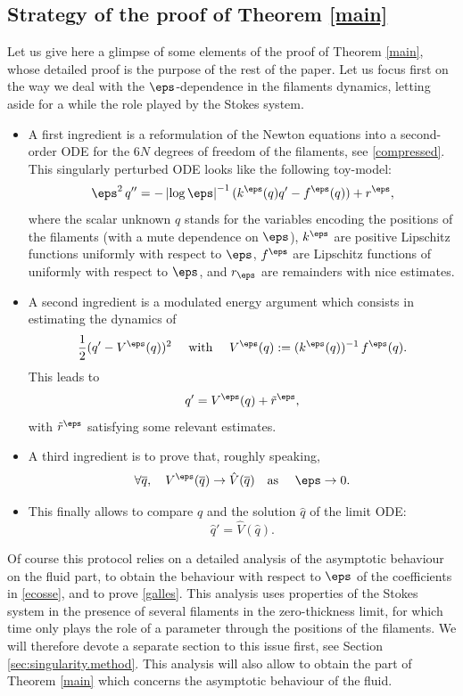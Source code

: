 \subsection{Strategy of the proof of Theorem \ref{main}} \label{sec:strategy}
Let us give here a glimpse of some elements of the proof of Theorem \ref{main}, whose detailed proof is the purpose of the rest of the paper.
Let us focus first on the way we deal with the $\eps$-dependence in the filaments dynamics, letting aside for a while the role played by the Stokes system.
\begin{itemize}
\item A first ingredient is a reformulation of the Newton equations into a second-order ODE for the $6N$ degrees of freedom of the filaments, see \eqref{compressed}. This singularly perturbed ODE looks like the following toy-model:
\begin{equation}
\label{ecosse}
\eps^2 \, q'' = - \left|\log \eps\right|^{-1} (k^\eps(q) q' - f^\eps(q)) + r^\eps,
\end{equation}
where the scalar
unknown $q$ stands for the variables encoding the positions of the filaments (with a mute dependence on $\eps$), $k^\eps $ are positive Lipschitz functions uniformly with respect to $\eps$, $f^\eps$ are Lipschitz functions of
uniformly with respect to $\eps$, and $r_\eps$ are remainders
with nice estimates.
\item A second ingredient is a modulated energy argument which consists in estimating the dynamics of\vspace*{-3pt}
\begin{equation*}
\frac12 (q' - V^\eps(q))^2 \quad \text{ with } \quad V^\eps(q) := (k^\eps(q))^{-1} \, f^\eps(q).
\end{equation*}
This leads to
\begin{equation}
\label{irlande}
q' = V^\eps(q) + \tilde r^\eps,
\end{equation}
with $\tilde r^\eps$ satisfying some relevant estimates.
\item A third ingredient is to prove that, roughly speaking,\vspace*{-3pt}
\begin{equation}
\label{galles}
\forall \overline q, \quad V^\eps(\overline q) \to \hat V(\overline q) \quad \text{as } \quad \eps \to0.
\end{equation}
\item This finally allows to compare $q$ and the solution $\hat q$ of the limit ODE:\vspace*{-3pt}
\[
\hat q' = \hat V(\hat q).\]
\end{itemize}
Of course this protocol relies on a detailed analysis of the asymptotic behaviour {on the fluid part}, to obtain the behaviour with respect to $\eps$ of the coefficients in \eqref{ecosse},
and to prove \eqref{galles}.
This analysis uses properties of the Stokes system in the presence of several filaments in the zero-thickness limit, for which time only plays the role of a parameter through the positions of the filaments.
We will therefore devote a separate section to this issue first, {see} Section \ref{sec:singularity.method}.
This analysis will also allow to obtain the part of Theorem \ref{main} which concerns the asymptotic behaviour {of the fluid}.

